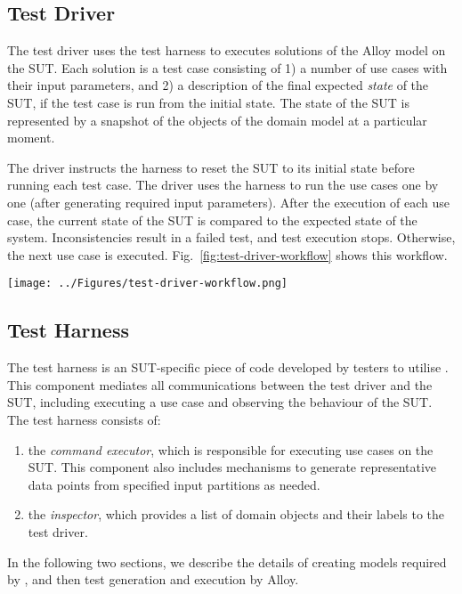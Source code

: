 
\subsection{Test Driver}
\label{sec:framework-overview-test-driver}
The test driver uses the test harness to executes solutions of the Alloy model on the SUT.
Each solution is a test case consisting of 1) a number of use cases with their input parameters,
and 2) a description of the final expected \textit{state} of the SUT, if the test case is run from the initial state.
The state of the SUT is represented by a snapshot of the objects of the domain model at a particular moment. 

The driver instructs the harness to reset the SUT to its initial state before running each test case.
The driver uses the harness to run the use cases one by one (after generating required input parameters).
After the execution of each use case, the current state of the SUT is compared to the expected state of the system. 
Inconsistencies result in a failed test, and test execution stops. Otherwise, the next use case is executed.
Fig.~\ref{fig:test-driver-workflow} shows this workflow.

\begin{figure*}[!t]
\centering
\texttt{[image: ../Figures/test-driver-workflow.png]}
\caption{The workflow of the test driver.}
\label{fig:test-driver-workflow}
\end{figure*}

\subsection{Test Harness}
\label{sec:framework-overview-test-harness}
The test harness is an SUT-specific piece of code developed by testers to utilise \this. This component mediates all communications between the test driver and the SUT, including executing a use case and observing the behaviour of the SUT. The test harness consists of: 
\begin{enumerate}
	\item the \textit{command executor}, which is responsible for executing use cases on the SUT.  This component also includes mechanisms to generate representative data points from specified input partitions as needed. 
	
	\item the \textit{inspector}, which provides a list of domain objects and their labels to the test driver.
\end{enumerate}

In the following two sections, we describe the details of creating models required by \this, and then test generation and execution by Alloy.